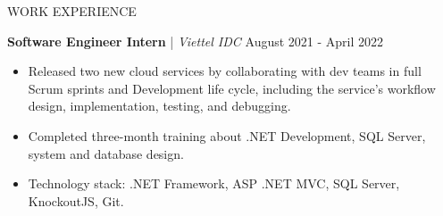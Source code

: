 \begin{rSection}{WORK EXPERIENCE}
      \vspace{1em}

      \quad\textbf{Software Engineer Intern} | \textit{Viettel IDC} \hfill August 2021 - April 2022\\
      \begin{itemize}
            \itemsep 0pt {} \vspace{-1em}
            \item Released two new cloud services by collaborating with dev teams in full Scrum sprints and Development life cycle,
                  including the service's workflow design, implementation, testing, and debugging.
            \item Completed three-month training about .NET Development, SQL Server, system and database design.
            \item Technology stack: .NET Framework, ASP .NET MVC, SQL Server, KnockoutJS, Git.

      \end{itemize}

\end{rSection}


